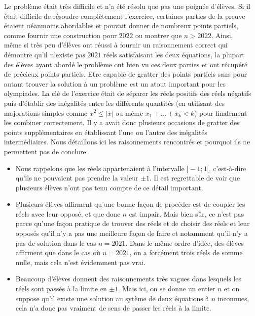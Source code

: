 Le problème était très difficile et n'a été résolu que pas une poignée d'élèves. Si il était difficile de résoudre complètement l'exercice, certaines parties de la preuve étaient néanmoins abordables et pouvait donner de nombreux points partiels, comme fournir une construction pour $2022$ ou montrer que $n>2022$.  Ainsi, même si très peu d'élèves ont réussi à fournir un raisonnement correct qui démontre qu'il n'existe pas $2021$ réels satisfaisant les deux équations, la plupart des élèves ayant abordé le problème ont bien vu ces deux parties et ont récupéré de précieux points partiels. Etre capable de gratter des points partiels sans pour autant trouver la solution à un problème est un atout important pour les olympiades. La clé de l'exercice était de séparer les réels positifs des réels négatifs puis d'établir des inégalités entre les différents quantités (en utilisant des majorations simples comme $x^2\leqslant |x|$ ou même $x_1+\ldots +x_k <k$) pour finalement les combiner correctement. Il y a avait donc plusieurs occasions de gratter des points supplémentaires en établissant l'une ou l'autre des inégalités intermédiaires.
Nous détaillons ici les raisonnements rencontrés et pourquoi ils ne permettent pas de conclure.
\begin{itemize}
\item Nous rappelons que les réels appartenaient à l'intervalle $]-1;1[$, c'est-à-dire qu'ils ne pouvaient pas prendre la valeur $\pm 1$. Il est regrettable de voir que plusieurs élèves n'ont pas tenu compte de ce détail important. 
\item Plusieurs élèves affirment qu'une bonne façon de procéder est de coupler les réels avec leur opposé, et que donc $n$ est impair. Mais bien sûr, ce n'est pas parce qu'une façon pratique de trouver des réels et de choisir des réels et leur opposés qu'il n'y a pas une meilleure façon de faire et notamment qu'il n'y a pas de solution dans le cas $n=2021$. Dans le même ordre d'idée, des élèves affirment que dans le cas où $n=2021$, on a forcément trois réels de somme nulle, mais cela n'est évidemment pas vrai. 
\item Beaucoup d'élèves donnent des raisonnements très vagues dans lesquels les réels sont passés à la limite en $\pm 1$. Mais ici, on se donne un entier $n$ et  on suppose qu'il existe une solution au sytème de deux équations à $n$ inconnues, cela n'a donc pas vraiment de sens de passer les réels à la limite.
\end{itemize}